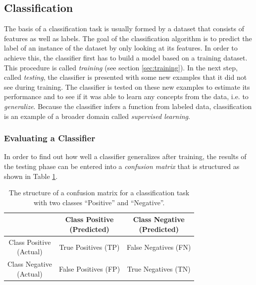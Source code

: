 \subsection{Classification}

The basis of a classification task is usually formed by a dataset that
consists of features as well as labels. The goal of the classification
algorithm is to predict the label of an instance of the dataset by
only looking at its features. In order to achieve this, the classifier
first has to build a model based on a training dataset. This procedure is called
\textit{training} (see section \ref{sec:training}). In the next step,
called \textit{testing}, the classifier is presented with
some new examples that it did not see during training. The classifier
is tested on these new examples to estimate its performance and to see
if it was able to learn any concepts from the data, i.e. to
\textit{generalize}. Because the classifier infers a function from
labeled data, classification is an example of a broader domain
called \textit{supervised learning}.

\subsubsection{Evaluating a Classifier}
\label{sec:classification-evaluation}

In order to find out how well a classifier generalizes after training,
the results of the testing phase can be entered into a
\textit{confusion matrix} that is structured as shown in Table
\ref{tbl:confusion-matrix}.
\begin{table}[h]
  \centering
  \renewcommand\theadfont{\bfseries}
  \begin{tabular}{|c|c|c|}
    \hline
    & \thead{Class Positive\\(Predicted)} & \thead{Class Negative\\(Predicted)} \\
    \hline
    \thead{Class Positive\\(Actual)} & True Positives (TP) & False
    Negatives (FN) \\
    \hline
    \thead{Class Negative\\(Actual)} & False Positives (FP) & True
    Negatives (TN) \\
    \hline
  \end{tabular}
  \caption{The structure of a confusion matrix for a
    classification task with two classes ``Positive'' and
    ``Negative''.}
  \label{tbl:confusion-matrix}
\end{table}

